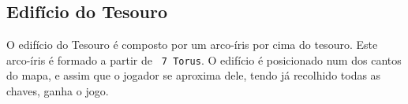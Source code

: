 

\subsection{Edifício do Tesouro}

	O edifício do Tesouro é composto por um arco-íris por cima do tesouro. Este arco-íris é 
formado a partir de \verb+ 7 Torus+.
	O edifício é posicionado num dos cantos do mapa, e assim que o jogador se aproxima dele, tendo já recolhido todas as chaves, ganha o jogo.
